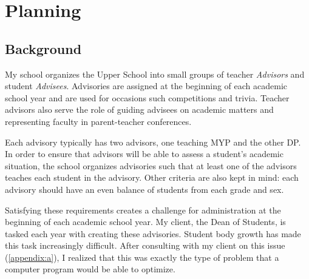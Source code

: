 \documentclass{paper}
\begin{document}
\insertTitlePage
{}
\tableofcontents
\thispagestyle{frontorback}
\newpage
\setcounter{page}{1}
\justifying

\section{Planning}
\label{sec:planning}
\subsection{Background}
My school organizes the Upper School into small groups of teacher \textit{Advisors} and student \textit{Advisees}.
Advisories are assigned at the beginning of each academic school year and are used for occasions such competitions and trivia.
Teacher advisors also serve the role of guiding advisees on academic matters and representing faculty in parent-teacher conferences.

Each advisory typically has two advisors, one teaching MYP and the other DP.
In order to ensure that advisors will be able to assess a student's academic situation, the school organizes advisories such that at least one of the advisors teaches each student in the advisory.
Other criteria are also kept in mind: each advisory should have an even balance of students from each grade and sex.

Satisfying these requirements creates a challenge for administration at the beginning of each academic school year.
My client, the Dean of Students, is tasked each year with creating these advisories.
Student body growth has made this task increasingly difficult.
After consulting with my client on this issue (\cref{appendix:a}), I realized that this was exactly the type of problem that a computer program would be able to optimize.
\end{document}
